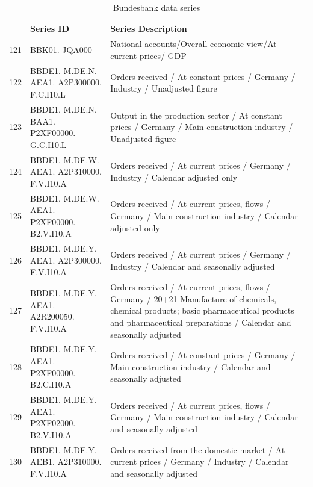 \documentclass[12pt]{article}
\begin{document}
\begin{table}[ht]
\caption{Bundesbank data series}
\label{bb data}
\centering
\begin{tabular}{r|p{4cm}p{11cm}}
	\hline
	& Series ID & Series Description \\
	\hline
	121 & BBK01. JQA000 & National accounts/Overall economic view/At current prices/ GDP \\ 
	\hline
	122 & BBDE1. M.DE.N. AEA1. A2P300000. F.C.I10.L & Orders received / At constant prices / Germany / Industry /
	 Unadjusted figure \\ 
	 \hline
	123 & BBDE1. M.DE.N. BAA1. P2XF00000. G.C.I10.L & Output in the production sector / At constant prices / Germany / Main construction industry / Unadjusted figure \\ 
	\hline
	124 & BBDE1. M.DE.W. AEA1. A2P310000. F.V.I10.A & Orders received / At current prices / Germany / Industry / Calendar adjusted only \\ 
	\hline
	125 & BBDE1. M.DE.W. AEA1. P2XF00000. B2.V.I10.A & Orders received / At current prices, flows / Germany / Main construction industry / Calendar adjusted only \\ 
	\hline
	126 & BBDE1. M.DE.Y. AEA1. A2P300000. F.V.I10.A & Orders received / At current prices / Germany / Industry / Calendar and seasonally adjusted \\ 
	\hline
	127 & BBDE1. M.DE.Y. AEA1. A2R200050. F.V.I10.A & Orders received / At current prices, flows / Germany / 20+21 Manufacture of chemicals, chemical products; basic pharmaceutical products and pharmaceutical preparations / Calendar and seasonally adjusted \\ 
	\hline
	128 & BBDE1. M.DE.Y. AEA1. P2XF00000. B2.C.I10.A & Orders received / At constant prices / Germany / Main construction industry / Calendar and seasonally adjusted \\ 
	\hline
	129 & BBDE1. M.DE.Y. AEA1. P2XF02000. B2.V.I10.A & Orders received / At current prices, flows / Germany / Main construction industry / Calendar and seasonally adjusted \\ 
	\hline
	130 & BBDE1. M.DE.Y. AEB1. A2P310000. F.V.I10.A & Orders received from the domestic market / At current prices / Germany / Industry / Calendar and seasonally adjusted \\ 
	\hline
\end{tabular}
\end{table}
\end{document}
